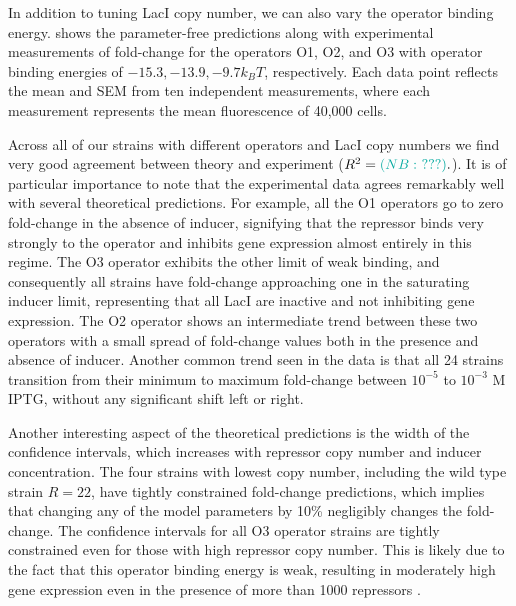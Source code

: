 In addition to tuning LacI copy number, we can also vary the operator binding
energy.  shows the parameter-free predictions along with
experimental measurements of fold-change for the operators O1, O2, and O3 with
operator binding energies of $-15.3, -13.9, -9.7k_BT$, respectively. Each data
point reflects the mean and SEM from ten independent measurements, where each
measurement represents the mean fluorescence of 40,000 cells.

Across all of our strains with different operators and LacI copy numbers we find
very good agreement between theory and experiment ($R^2=\nathanComment{???}.$).
It is of particular importance to note that the experimental data agrees
remarkably well with several theoretical predictions. For example, all the O1
operators go to zero fold-change in the absence of inducer, signifying that the
repressor binds very strongly to the operator and inhibits gene expression
almost entirely in this regime. The O3 operator exhibits the other limit of weak
binding, and consequently all strains have fold-change approaching one in the
saturating inducer limit, representing that all LacI are inactive and not
inhibiting gene expression. The O2 operator shows an intermediate trend between
these two operators with a small spread of fold-change values both in the
presence and absence of inducer. Another common trend seen in the data is that
all 24 strains transition from their minimum to maximum fold-change between
$10^{-5}$ to $10^{-3} \,\, \text{M}$ IPTG, without any significant shift left or
right. 


Another interesting aspect of the theoretical predictions is the width of the
confidence intervals, which increases with repressor copy number and inducer
concentration. The four strains with lowest copy number, including the wild type
strain $R=22$, have tightly constrained fold-change predictions, which implies
that changing any of the model parameters by 10\% negligibly changes the
fold-change. The confidence intervals for all O3 operator strains are tightly
constrained even for those with high repressor copy number. This is likely due
to the fact that this operator binding energy is weak, resulting in moderately
high gene expression even in the presence of more than 1000 repressors
.

